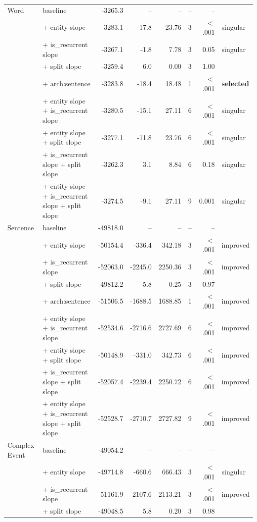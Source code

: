\begin{longtable}{@{}llrrrrrl@{}}
\bottomrule
\endlastfoot
Word & baseline & -3265.3 & -- & -- & -- & -- &  \\
 & + entity slope & -3283.1 & -17.8 & 23.76 & 3 & $<$.001 & singular \\
 & + is\_recurrent slope & -3267.1 & -1.8 & 7.78 & 3 & 0.05 & singular \\
 & + split slope & -3259.4 & 6.0 & 0.00 & 3 & 1.00 &  \\
 & + arch:sentence & -3283.8 & -18.4 & 18.48 & 1 & $<$.001 & \textbf{selected} \\
 & + entity slope + is\_recurrent slope & -3280.5 & -15.1 & 27.11 & 6 & $<$.001 & singular \\
 & + entity slope + split slope & -3277.1 & -11.8 & 23.76 & 6 & $<$.001 & singular \\
 & + is\_recurrent slope + split slope & -3262.3 & 3.1 & 8.84 & 6 & 0.18 & singular \\
 & + entity slope + is\_recurrent slope + split slope & -3274.5 & -9.1 & 27.11 & 9 & 0.001 & singular \\
\addlinespace
Sentence & baseline & -49818.0 & -- & -- & -- & -- &  \\
 & + entity slope & -50154.4 & -336.4 & 342.18 & 3 & $<$.001 & improved \\
 & + is\_recurrent slope & -52063.0 & -2245.0 & 2250.36 & 3 & $<$.001 & improved \\
 & + split slope & -49812.2 & 5.8 & 0.25 & 3 & 0.97 &  \\
 & + arch:sentence & -51506.5 & -1688.5 & 1688.85 & 1 & $<$.001 & improved \\
 & + entity slope + is\_recurrent slope & -52534.6 & -2716.6 & 2727.69 & 6 & $<$.001 & improved \\
 & + entity slope + split slope & -50148.9 & -331.0 & 342.73 & 6 & $<$.001 & improved \\
 & + is\_recurrent slope + split slope & -52057.4 & -2239.4 & 2250.72 & 6 & $<$.001 & improved \\
 & + entity slope + is\_recurrent slope + split slope & -52528.7 & -2710.7 & 2727.82 & 9 & $<$.001 & improved \\
\addlinespace
Complex Event & baseline & -49054.2 & -- & -- & -- & -- &  \\
 & + entity slope & -49714.8 & -660.6 & 666.43 & 3 & $<$.001 & singular \\
 & + is\_recurrent slope & -51161.9 & -2107.6 & 2113.21 & 3 & $<$.001 & improved \\
 & + split slope & -49048.5 & 5.8 & 0.20 & 3 & 0.98 &  \\

\end{longtable}
